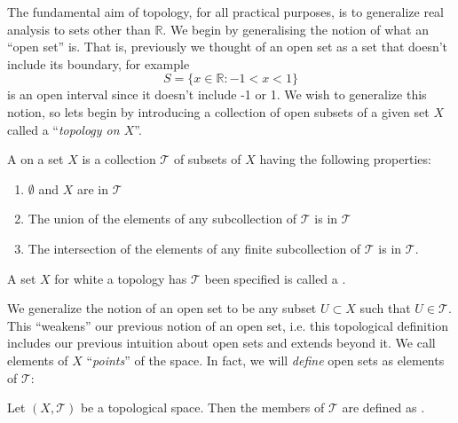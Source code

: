 \begin{prob}
The fundamental aim of topology, for all practical purposes, is
to generalize real analysis to sets other than $\mathbb{R}$. We
begin by generalising the notion of what an ``open set'' is. That
is, previously we thought of an open set as a set that doesn't
include its boundary, for example
\begin{equation}
S = \{x\in\mathbb{R}: -1<x<1\}
\end{equation}
is an open interval since it doesn't include -1 or 1. We wish to
generalize this notion, so lets begin by introducing a collection
of open subsets of a given set $X$ called a ``\emph{topology on $X$}''.
\end{prob}

\begin{defn}\label{defn:topology}
A  on a set $X$ is a collection $\mathcal{T}$ of
subsets of $X$ having the following properties:
\begin{enumerate}
\item $\emptyset$ and $X$ are in $\mathcal{T}$
\item The union of the elements of any subcollection of
  $\mathcal{T}$ is in $\mathcal{T}$
\item The intersection of the elements of any finite
  subcollection of $\mathcal{T}$ is in $\mathcal{T}$.
\end{enumerate}
A set $X$ for white a topology has $\mathcal{T}$ been specified
is called a .
\end{defn}

We generalize the notion of an open set to be any subset
$U\subset X$ such that $U\in\mathcal{T}$. This ``weakens'' our
previous notion of an open set, i.e. this topological definition
includes our previous intuition about open sets and extends
beyond it. We call elements of $X$ ``\emph{points}'' of the
space. In fact, we will \emph{define} open sets as elements of
$\mathcal{T}$:

\begin{defn}\label{defn:openSets}
  Let $(X,\mathcal{T})$ be a topological space. Then the members
  of $\mathcal{T}$ are defined as .
\end{defn}

